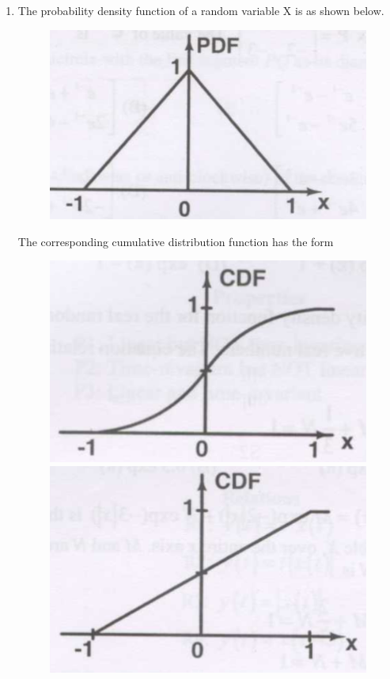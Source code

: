 \documentclass[a4paper, 11pt]{article}
\begin{document}
\begin{enumerate}
    \item The probability density function  of a random variable X is as shown below.
    \begin{figure}[H]
        \centering
        \includegraphics[width=0.4\columnwidth]{figs/q24.png}
    \end{figure}
    The corresponding cumulative distribution function  has the form
    \begin{figure}[H]
        \centering
        \begin{minipage}{0.45\textwidth}
            \centering
            \includegraphics[width=0.8\columnwidth]{figs/q24A.png}
            \centerline{}
        \end{minipage}
        \hfill
        \begin{minipage}{0.45\textwidth}
            \centering
            \includegraphics[width=0.8\columnwidth]{figs/q24b.png}

\end{minipage}
\end{figure}
\end{enumerate}
\end{document}
